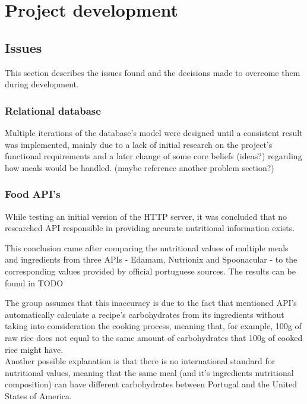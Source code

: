 %
%
\chapter{Project development}

    \section{Issues}

    This section describes the issues found and the decisions made
    to overcome them during development.
    
    \subsection{Relational database}

    Multiple iterations of the database's model were designed until a consistent result was implemented,
    mainly due to a lack of initial research on the project's functional requirements and a later change
    of some core beliefs (ideas?) regarding how meals would be handled. (maybe reference another problem
    section?)\\

    \subsection{Food API's}

    While testing an initial version of the HTTP server,
    it was concluded that no researched API responsible in
    providing accurate nutritional information exists.

    This conclusion came after comparing the nutritional values of multiple
    meals and ingredients from three APIs - Edamam, Nutrionix and Spoonacular -
    to the corresponding values provided by official portuguese sources. 
    The results can be found in TODO

    The group assumes that this inaccuracy is due to the fact that
    mentioned API's automatically calculate a recipe's carbohydrates
    from its ingredients without taking into consideration the cooking process, meaning that, for example,  
    100g of raw rice does not equal to the same amount of carbohydrates that 100g of 
    cooked rice might have.\\

    Another possible explanation is that there is no international standard for nutritional values,
    meaning that the same meal (and it's ingredients nutritional composition) 
    can have different carbohydrates between Portugal and the United States of America.\\
    
